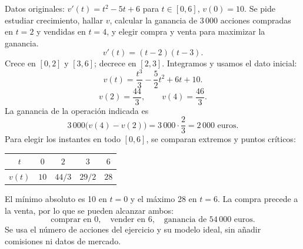 \documentclass[11pt]{article}
\begin{document}
Datos originales: $v'(t)=t^2-5t+6$ para $t\in[0,6]$, $v(0)=10$. Se pide estudiar crecimiento, hallar $v$, calcular la ganancia de 3\,000 acciones compradas en $t=2$ y vendidas en $t=4$, y elegir compra y venta para maximizar la ganancia.
\[v'(t)=(t-2)(t-3).\]
Crece en $[0,2]$ y $[3,6]$; decrece en $[2,3]$. Integramos y usamos el dato inicial:
\[\boxed{v(t)=\frac{t^3}3-\frac52t^2+6t+10}.\]
\[v(2)=\frac{44}3,\qquad v(4)=\frac{46}3.\]
La ganancia de la operación indicada es
\[3\,000\bigl(v(4)-v(2)\bigr)=3\,000\cdot\frac23=\boxed{2\,000\text{ euros}}.\]
Para elegir los instantes en todo $[0,6]$, se comparan extremos y puntos críticos:
\begin{center}\begin{tabular}{c|cccc}
$t$ & $0$ & $2$ & $3$ & $6$\\\hline
$v(t)$ & $10$ & $44/3$ & $29/2$ & $28$
\end{tabular}\end{center}
El mínimo absoluto es 10 en $t=0$ y el máximo 28 en $t=6$. La compra precede a la venta, por lo que se pueden alcanzar ambos:
\[\boxed{\text{comprar en }0,\quad\text{vender en }6,\quad\text{ganancia de }54\,000\text{ euros}}.\]
Se usa el número de acciones del ejercicio y su modelo ideal, sin añadir comisiones ni datos de mercado.
\end{document}
